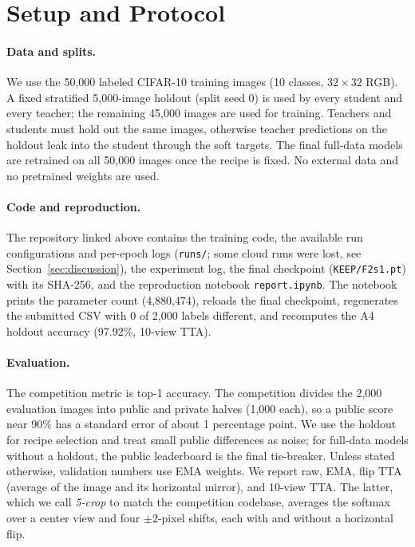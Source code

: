 \section{Setup and Protocol}
\label{sec:setup}

\paragraph{Data and splits.}
We use the 50,000 labeled CIFAR-10 training images (10 classes, $32\times32$
RGB). A fixed stratified 5,000-image holdout (split seed 0) is used by every
student and every teacher; the remaining 45,000 images are used for training.
Teachers and students must hold out the same images, otherwise teacher
predictions on the holdout leak into the student through the soft targets. The
final full-data models are retrained on all 50,000 images once the recipe is
fixed. No external data and no pretrained weights are used.

\paragraph{Code and reproduction.}
The repository linked above contains the training code, the available run configurations and per-epoch logs (\texttt{runs/}; some cloud runs were lost, see Section~\ref{sec:discussion}), the experiment log, the final checkpoint (\texttt{KEEP/F2s1.pt}) with its SHA-256, and the reproduction notebook \texttt{report.ipynb}. The notebook prints the parameter count (4,880,474), reloads the final checkpoint, regenerates the submitted CSV with 0 of 2,000 labels different, and recomputes the A4 holdout accuracy (97.92\%, 10-view TTA).

\paragraph{Evaluation.}
The competition metric is top-1 accuracy. The competition divides the 2,000 evaluation
images into public and private halves (1,000 each), so a public score near 90\%
has a standard error of about 1 percentage point. We use the holdout for recipe
selection and treat small public differences as noise; for full-data models
without a holdout, the public leaderboard is the final tie-breaker. Unless
stated otherwise, validation numbers use EMA weights. We report raw, EMA, flip
TTA (average of the image and its horizontal mirror), and 10-view TTA. The latter,
which we call \emph{5-crop} to match the competition codebase, averages the
softmax over a center view and four $\pm2$-pixel shifts, each with and without a
horizontal flip.

